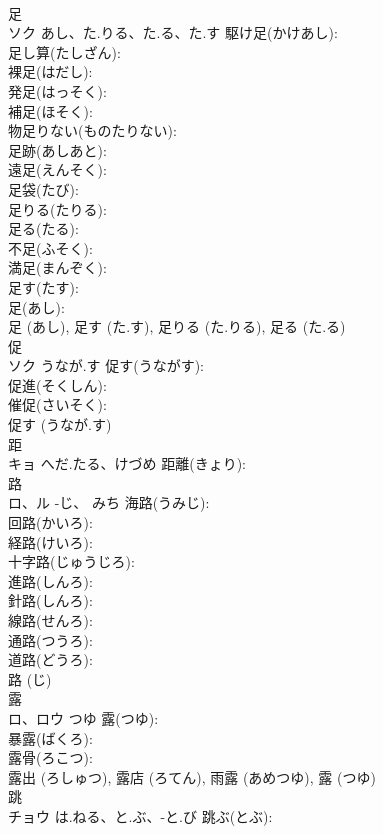\documentclass[8pt]{extreport}
\begin{document}
\begin{CJK}{UTF8}{min}
\\	足			
\\	ソク	あし、た.りる、た.る、た.す	駆け足(かけあし): 
\\	足し算(たしざん): 
\\	裸足(はだし): 
\\	発足(はっそく): 
\\	補足(ほそく): 
\\	物足りない(ものたりない): 
\\	足跡(あしあと): 
\\	遠足(えんそく): 
\\	足袋(たび): 
\\	足りる(たりる): 
\\	足る(たる): 
\\	不足(ふそく): 
\\	満足(まんぞく): 
\\	足す(たす): 
\\	足(あし): 
\\	足 (あし), 足す (た.す), 足りる (た.りる), 足る (た.る)
\\	促			
\\	ソク	うなが.す	促す(うながす): 
\\	促進(そくしん): 
\\	催促(さいそく): 
\\	促す (うなが.す)
\\	距			
\\	キョ	へだ.たる、けづめ	距離(きょり): 
\\	路			
\\	ロ、ル	-じ、 みち	海路(うみじ): 
\\	回路(かいろ): 
\\	経路(けいろ): 
\\	十字路(じゅうじろ): 
\\	進路(しんろ): 
\\	針路(しんろ): 
\\	線路(せんろ): 
\\	通路(つうろ): 
\\	道路(どうろ): 
\\	路 (じ)
\\	露			
\\	ロ、ロウ	つゆ	露(つゆ): 
\\	暴露(ばくろ): 
\\	露骨(ろこつ): 
\\	露出 (ろしゅつ), 露店 (ろてん), 雨露 (あめつゆ), 露 (つゆ)
\\	跳			
\\	チョウ	は.ねる、と.ぶ、-と.び	跳ぶ(とぶ): 

\end{CJK}
\end{document}
